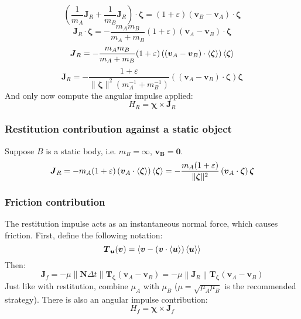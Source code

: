 \documentclass[10pt]{report}
\begin{document}
\begin{equation}\left(\frac{1}{m_A}\boldsymbol{J}_R+\frac{1}{m_B}\boldsymbol{J}_R\right)\cdot\boldsymbol{\zeta}=(1+\varepsilon)(\boldsymbol{v}_B-\boldsymbol{v}_A)\cdot\boldsymbol{\zeta}\end{equation}
\begin{equation}\boldsymbol{J}_R\cdot\boldsymbol{\zeta}=-\frac{m_Am_B}{m_A+m_B}(1+\varepsilon)(\boldsymbol{v}_A-\boldsymbol{v}_B)\cdot\boldsymbol{\zeta}\end{equation}
\begin{equation}\boldsymbol{J}_R=-\frac{m_Am_B}{m_A+m_B}(1+\varepsilon)\left((\boldsymbol{v}_A-\boldsymbol{v}_B)\cdot\braket{\boldsymbol{\zeta}}\right)\braket{\boldsymbol{\zeta}}\end{equation}
\begin{equation}\boldsymbol{J}_R=-\frac{1+\varepsilon}{\|\boldsymbol{\zeta}\|^2\left(m_A^{-1}+m_B^{-1}\right)}\left((\boldsymbol{v}_A-\boldsymbol{v}_B)\cdot\boldsymbol{\zeta}\right)\boldsymbol{\zeta}\end{equation}
And only now compute the angular impulse applied:
\begin{equation}H_R=\boldsymbol{\chi}\times\boldsymbol{J}_R\end{equation}

\subsubsection{Restitution contribution against a static object}
Suppose $B$ is a static body, i.e. $m_B=\infty$, $\boldsymbol{v_B}=\boldsymbol{0}$.
\begin{equation}\boldsymbol{J}_R=-m_A(1+\varepsilon)\left(\boldsymbol{v}_A\cdot\braket{\boldsymbol{\zeta}}\right)\braket{\boldsymbol{\zeta}}=-\frac{m_A(1+\varepsilon)}{\|\boldsymbol{\zeta}\|^2}\left(\boldsymbol{v}_A\cdot\boldsymbol{\zeta}\right)\boldsymbol{\zeta}\end{equation}

\subsubsection{Friction contribution}
The restitution impulse acts as an instantaneous normal force, which causes friction. First, define the following notation:
\begin{equation}\boldsymbol{T}_{\boldsymbol{u}}(\boldsymbol{v})=\braket{\boldsymbol{v}-(\boldsymbol{v}\cdot\braket{\boldsymbol{u}})\braket{\boldsymbol{u}}}\end{equation}
Then:
\begin{equation}\boldsymbol{J}_f=-\mu\|\boldsymbol{N}\Delta t\|\boldsymbol{T}_{\boldsymbol{\zeta}}(\boldsymbol{v}_A-\boldsymbol{v}_B)=-\mu\left\|\boldsymbol{J}_R\right\|\boldsymbol{T}_{\boldsymbol{\zeta}}(\boldsymbol{v}_A-\boldsymbol{v}_B)\end{equation}
Just like with restitution, combine $\mu_A$ with $\mu_B$ ($\mu=\sqrt{\mu_A\mu_B}$ is the recommended strategy). There is also an angular impulse contribution:
\begin{equation}H_f=\boldsymbol{\chi}\times\boldsymbol{J}_f\end{equation}
\end{document}
